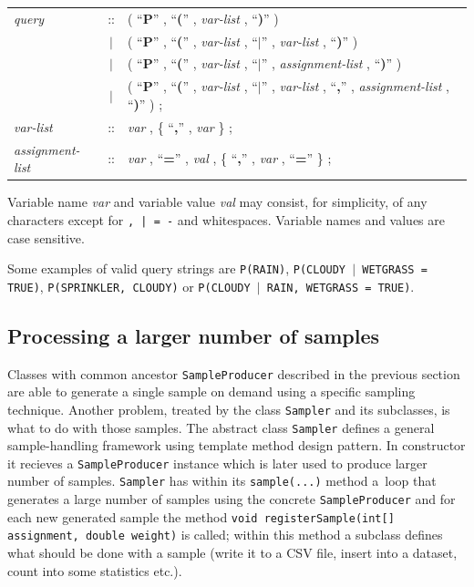 \documentclass[english,cover]{fitthesis} %
\newcommand{\srccode}[1]{{\tt #1}}         %
\newcommand{\bnfconst}[1]{``\textbf{#1}''} %
\newcommand{\bnfgroup}[1]{\textit{#1}}     %
\begin{document}
\begin{center}
\begin{tabular}{lcl}
    \bnfgroup{query} & ::
        & ( \bnfconst{P} , \bnfconst{(} , \bnfgroup{var-list} , \bnfconst{)} ) \\
    & $\mid$
        & ( \bnfconst{P} , \bnfconst{(} , \bnfgroup{var-list} , \bnfconst{$\mid$} , \bnfgroup{var-list} , \bnfconst{)} ) \\
    & $\mid$
        & ( \bnfconst{P} , \bnfconst{(} , \bnfgroup{var-list} , \bnfconst{$\mid$} , \bnfgroup{assignment-list} , \bnfconst{)} ) \\
    & $\mid$
        & ( \bnfconst{P} , \bnfconst{(} , \bnfgroup{var-list} , \bnfconst{$\mid$} , \bnfgroup{var-list} , \bnfconst{,} , \bnfgroup{assignment-list} , \bnfconst{)} ) ; \\
    \bnfgroup{var-list} & ::
        & \bnfgroup{var} , \{ \bnfconst{,} , \bnfgroup{var} \} ; \\
    \bnfgroup{assignment-list} & ::
        & \bnfgroup{var} , \bnfconst{=} , \bnfgroup{val} , \{ \bnfconst{,} , \bnfgroup{var} , \bnfconst{=} \} ; \\
\end{tabular}
\end{center}

Variable name \bnfgroup{var} and variable value \bnfgroup{val} may consist, for simplicity, of any characters except for {\tt , | = -} and whitespaces. Variable names and values are case sensitive.

Some examples of valid query strings are \srccode{P(RAIN)}, \srccode{P(CLOUDY $\mid$ WETGRASS = TRUE)}, \srccode{P(SPRINKLER, CLOUDY)} or \srccode{P(CLOUDY $\mid$ RAIN, WETGRASS = TRUE)}.



\subsection{Processing a larger number of samples}
Classes with common ancestor \srccode{SampleProducer} described in the previous section are able to generate a single sample on demand using a specific sampling technique. Another problem, treated by the class \srccode{Sampler} and its subclasses, is what to do with those samples. The abstract class \srccode{Sampler} defines a general sample-handling framework using template method design pattern. In constructor it recieves a \srccode{SampleProducer} instance which is later used to produce larger number of samples. \srccode{Sampler} has within its \srccode{sample(...)} method a~loop that generates a large number of samples using the concrete \srccode{SampleProducer} and for each new generated sample the method \srccode{void registerSample(int[] assignment, double weight)} is called; within this method a subclass defines what should be done with a sample (write it to a CSV file, insert into a dataset, count into some statistics etc.).
\end{document}
